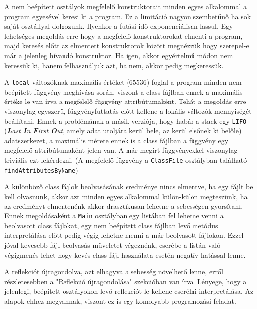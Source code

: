 \begin{compactitem}
	\item A nem beépített osztályok megfelelő konstruktorait minden egyes alkalommal a program egyesével keresi ki a program. Ez a limitáció nagyon szembetűnő ha sok saját osztállyal dolgozunk. Ilyenkor a futási idő exponenciálisan lassul. Egy lehetséges megoldás erre hogy a megfelelő konstruktorokat elmenti a program, majd keresés előtt az elmentett konstruktorok között megnézzük hogy szerepel-e már a jelenleg hívandó konstruktor. Ha igen, akkor egyértelmű módon nem keressük ki, hanem felhasználjuk azt, ha nem, akkor pedig megkeressük.
	\item A \lstinline{local} változóknak maximális értéket ($65536$) foglal a program minden nem beépített függvény meghívása során, viszont a class fájlban ennek a maximális értéke le van írva a megfelelő függvény attribútumaként. Tehát a megoldás erre viszonylag egyszerű, függvényfuttatás előtt kellene a lokális változók mennyiségét beállítani. Ennek a problémának a másik verziója, hogy habár a stack egy \lstinline{LIFO} (\textit{\textbf{L}ast \textbf{I}n \textbf{F}irst \textbf{O}ut}, amely adat utoljára kerül bele, az kerül elsőnek ki belőle) adatszerkezet, a maximális mérete ennek is a class fájlban a függvény egy megfelelő attribútumaként jelen van. A már megírt függvényekkel viszonylag triviális ezt lekérdezni. (A megfelelő függvény a \lstinline{ClassFile} osztályban található \lstinline{findAttributesByName})
	\item A különböző class fájlok beolvasásának eredménye nincs elmentve, ha egy fájlt be kell olvasnunk, akkor azt minden egyes alkalommal külön-külön megteszünk, ha az eredményt elmentenénk akkor drasztikusan lehetne a sebességen gyorsítani. Ennek megoldásaként a \lstinline{Main} osztályban egy listában fel lehetne venni a beolvasott class fájlokat, egy nem beépített class fájlban levő metódus interpretálása előtt pedig végig lehetne menni a már beolvasott fájlokon. Ezzel jóval kevesebb fájl beolvasás műveletet végeznénk, cserébe a listán való végigmenés lehet hogy kevés class fájl használata esetén negatív hatással lenne.
	\item A reflekciót újragondolva, azt elhagyva a sebesség növelhető lenne, erről részletesebben a "Reflekció újragondolása" szekcióban van írva. Lényege, hogy a jelenlegi, beépített osztályokon levő reflekciót le kellene cserélni interpretálása. Az alapok ehhez megvannak, viszont ez is egy komolyabb programozási feladat.
\end{compactitem}

